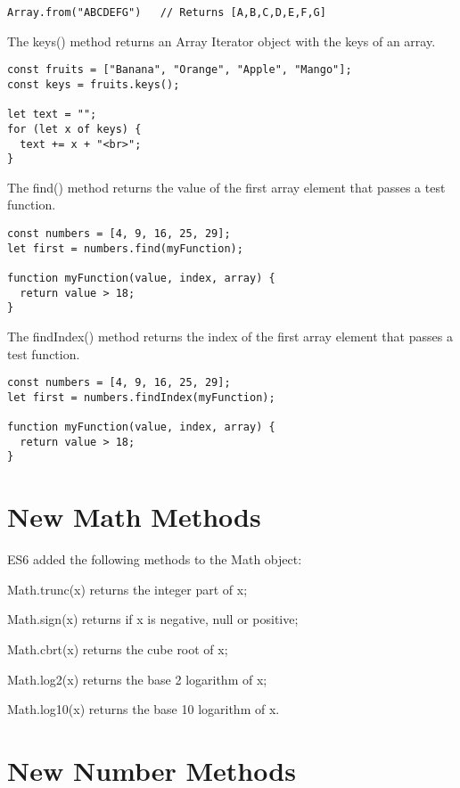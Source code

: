 \documentclass[a4paper,12pt]{article}
\begin{document}
\begin{large}
\begin{lstlisting}
Array.from("ABCDEFG")   // Returns [A,B,C,D,E,F,G]
\end{lstlisting}


The keys() method returns an Array Iterator object with the keys of an array.

\begin{lstlisting}
const fruits = ["Banana", "Orange", "Apple", "Mango"];
const keys = fruits.keys();

let text = "";
for (let x of keys) {
  text += x + "<br>";
}
\end{lstlisting}


The find() method returns the value of the first array element that passes a test function.

\begin{lstlisting}
const numbers = [4, 9, 16, 25, 29];
let first = numbers.find(myFunction);

function myFunction(value, index, array) {
  return value > 18;
}
\end{lstlisting}

The findIndex() method returns the index of the first array element that passes a test function.

\begin{lstlisting}
const numbers = [4, 9, 16, 25, 29];
let first = numbers.findIndex(myFunction);

function myFunction(value, index, array) {
  return value > 18;
}
\end{lstlisting}





\section*{New Math Methods}

ES6 added the following methods to the Math object:

Math.trunc(x) returns the integer part of x;

Math.sign(x) returns if x is negative, null or positive;

Math.cbrt(x) returns the cube root of x;

Math.log2(x) returns the base 2 logarithm of x;

Math.log10(x) returns the base 10 logarithm of x.




\section*{New Number Methods}


\end{large}
\end{document}
